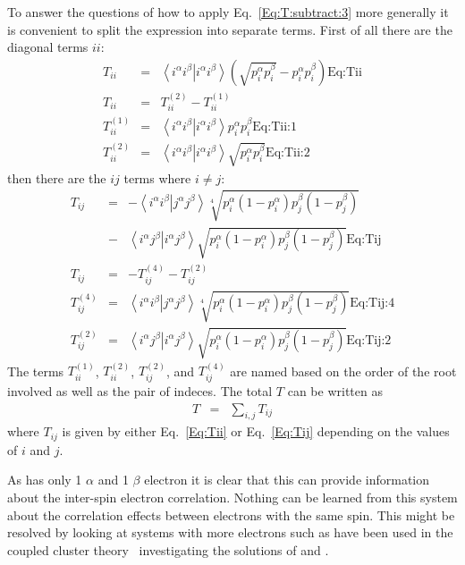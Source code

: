 \documentclass[pra,nofootinbib]{revtex4-1}
\newcommand{\eria}[4]{\left\langle #1^\alpha #2^\beta \right.\left| #3^\alpha #4^\beta \right\rangle}
\newcommand{\dlabel}[1]{\text{#1}\label{#1}}
\begin{document}
To answer the questions of how to apply Eq.~\ref{Eq:T:subtract:3} more generally it is convenient
to split the expression into separate terms. 
First of all there are the diagonal terms $ii$:
\begin{eqnarray}
   T_{ii}       &=& \eria{i}{i}{i}{i} \left(\sqrt{p_i^\alpha p_i^\beta}-p_i^\alpha p_i^\beta\right)
                    \dlabel{Eq:Tii} \\
   T_{ii}       &=& T^{(2)}_{ii}-T^{(1)}_{ii}  \\
   T^{(1)}_{ii} &=& \eria{i}{i}{i}{i}p_i^\alpha p_i^\beta        \dlabel{Eq:Tii:1} \\
   T^{(2)}_{ii} &=& \eria{i}{i}{i}{i}\sqrt{p_i^\alpha p_i^\beta} \dlabel{Eq:Tii:2}
\end{eqnarray}
then there are the $ij$ terms where $i \ne j$:
\begin{eqnarray}
   T_{ij}       &=& -\eria{i}{i}{j}{j} \sqrt[4]{p_i^\alpha(1-p_i^\alpha) p_j^\beta(1-p_j^\beta)} \nonumber \\
                &-& \eria{i}{j}{i}{j} \sqrt{p_i^\alpha(1-p_i^\alpha) p_j^\beta(1-p_j^\beta)}
                    \dlabel{Eq:Tij} \\
   T_{ij}       &=& -T^{(4)}_{ij}-T^{(2)}_{ij} \\
   T^{(4)}_{ij} &=& \eria{i}{i}{j}{j}\sqrt[4]{p_i^\alpha(1-p_i^\alpha) p_j^\beta(1-p_j^\beta)} \dlabel{Eq:Tij:4} \\
   T^{(2)}_{ij} &=& \eria{i}{j}{i}{j}\sqrt{p_i^\alpha(1-p_i^\alpha) p_j^\beta(1-p_j^\beta)}    \dlabel{Eq:Tij:2}
\end{eqnarray}
The terms $T^{(1)}_{ii}$, $T^{(2)}_{ii}$, $T^{(2)}_{ij}$, and $T^{(4)}_{ij}$ are named based on the order of
the root involved as well as the pair of indeces.
The total $T$ can be written as
\begin{eqnarray}
   T &=& \sum_{i,j} T_{ij}
\end{eqnarray}
where $T_{ij}$ is given by either Eq.~\ref{Eq:Tii} or Eq.~\ref{Eq:Tij} depending on the values of $i$ and $j$.

As  has only 1 $\alpha$ and 1 $\beta$ electron it is clear that this can provide information
about the inter-spin electron correlation. Nothing can be learned from this system about the correlation
effects between electrons with the same spin. This might be resolved by looking at systems with more 
electrons such as have been used in the coupled cluster theory~\cite{Kowalski_1998,Surj_n_2001} investigating
the solutions of  and .
\end{document}
